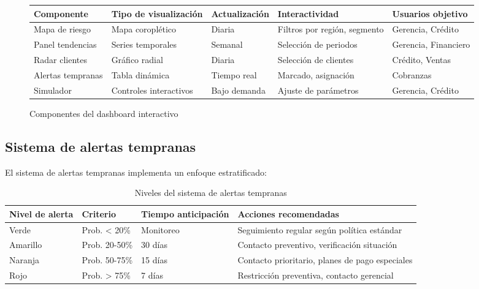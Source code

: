 \begin{figure}[ht]
\centering
\begin{tabular}{|p{2.5cm}|p{2.5cm}|p{2.5cm}|p{3cm}|p{2.5cm}|}
\hline
\textbf{Componente} & \textbf{Tipo de visualización} & \textbf{Actualización} & \textbf{Interactividad} & \textbf{Usuarios objetivo} \\
\hline
Mapa de riesgo & Mapa coroplético & Diaria & Filtros por región, segmento & Gerencia, Crédito \\
\hline
Panel tendencias & Series temporales & Semanal & Selección de periodos & Gerencia, Financiero \\
\hline
Radar clientes & Gráfico radial & Diaria & Selección de clientes & Crédito, Ventas \\
\hline
Alertas tempranas & Tabla dinámica & Tiempo real & Marcado, asignación & Cobranzas \\
\hline
Simulador & Controles interactivos & Bajo demanda & Ajuste de parámetros & Gerencia, Crédito \\
\hline
\end{tabular}
\caption{Componentes del dashboard interactivo}
\end{figure}

\subsection{Sistema de alertas tempranas}
El sistema de alertas tempranas implementa un enfoque estratificado:

\begin{table}[ht]
\centering
\begin{tabular}{|p{2.5cm}|p{2.5cm}|p{3cm}|p{6cm}|}
\hline
\textbf{Nivel de alerta} & \textbf{Criterio} & \textbf{Tiempo anticipación} & \textbf{Acciones recomendadas} \\
\hline
Verde & Prob. < 20\% & Monitoreo & Seguimiento regular según política estándar \\
\hline
Amarillo & Prob. 20-50\% & 30 días & Contacto preventivo, verificación situación \\
\hline
Naranja & Prob. 50-75\% & 15 días & Contacto prioritario, planes de pago especiales \\
\hline
Rojo & Prob. > 75\% & 7 días & Restricción preventiva, contacto gerencial \\
\hline
\end{tabular}
\caption{Niveles del sistema de alertas tempranas}
\end{table}

